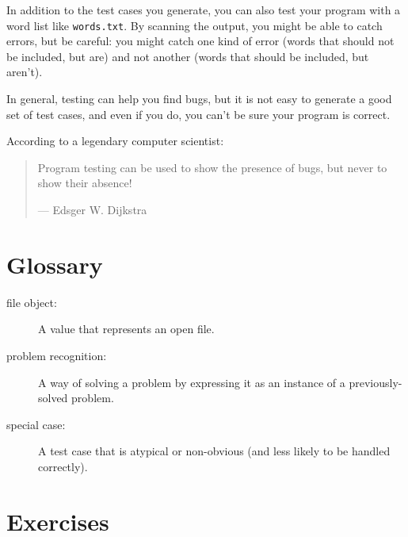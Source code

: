 \documentclass[10pt]{book}
\begin{document}

In addition to the test cases you generate, you can also test
your program with a word list like {\tt words.txt}.  By scanning
the output, you might be able to catch errors, but be careful:
you might catch one kind of error (words that should not be
included, but are) and not another (words that should be included,
but aren't).

In general, testing can help you find bugs, but it is not easy to
generate a good set of test cases, and even if you do, you can't
be sure your program is correct.


According to a legendary computer scientist:

\begin{quote}
Program testing can be used to show the presence of bugs, but never to
show their absence!

--- Edsger W. Dijkstra
\end{quote}



\section{Glossary}

\begin{description}

\item[file object:] A value that represents an open file.

\item[problem recognition:] A way of solving a problem by
expressing it as an instance of a previously-solved problem.

\item[special case:] A test case that is atypical or non-obvious
(and less likely to be handled correctly).

\end{description}


\section{Exercises}
\end{document}
